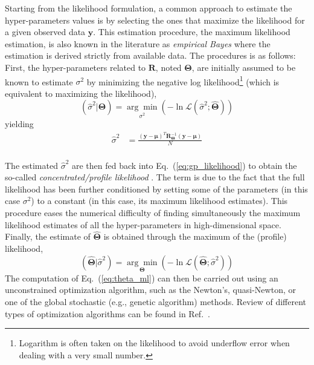 Starting from the likelihood formulation, a common approach to estimate the hyper-parameters values is by selecting the ones that maximize the likelihood for a given observed data $\mathbf{y}$.
This estimation procedure, the maximum likelihood estimation, is also known in the literature as \emph{empirical Bayes} \cite{Koehler1996} where the estimation is derived strictly from available data.
The procedures is as follows:
First, the hyper-parameters related to $\mathbf{R}$, noted $\boldsymbol{\Theta}$, are initially assumed to be known to estimate $\sigma^2$ by minimizing the negative log likelihood\footnote{Logarithm is often taken on the likelihood to avoid underflow error when dealing with a very small number.} (which is equivalent to maximizing the likelihood),
\begin{equation}
	\left(\hat{\sigma}^2 | \boldsymbol{\Theta}\right) = \underset{\sigma^2}{\arg\min} \left(- \ln \mathcal{L} (\hat{\sigma}^2 ; \hat{\boldsymbol{\Theta}})\right)
\label{eq:concentrated_likelihood_1}
\end{equation} 
yielding
\begin{equation}
	\begin{split}
		\hat{\sigma}^2           & = \frac{(\mathbf{y} - \boldsymbol{\mu})^T \mathbf{R}_{\boldsymbol{\Theta}}^{-1} (\mathbf{y} - \boldsymbol{\mu})}{N}\\
	\end{split}
\label{eq:sigma_ml}
\end{equation}

The estimated $\hat{\sigma}^2$ are then fed back into Eq.~(\ref{eq:gp_likelihood}) to obtain the so-called \emph{concentrated/profile likelihood} \cite{Cole2013,Kreutz2013}.
The term is due to the fact that the full likelihood has been further conditioned by setting some of the parameters 
(in this case $\sigma^2$) to a constant (in this case, its maximum likelihood estimates).
This procedure eases the numerical difficulty of finding simultaneously the maximum likelihood estimates of all the hyper-parameters in high-dimensional space.
Finally, the estimate of $\hat{\boldsymbol{\Theta}}$ is obtained through the maximum of the (profile) likelihood,
\begin{equation}
	\left(\hat{\boldsymbol{\Theta}} | \hat{\sigma}^2\right) = \underset{\boldsymbol{\Theta}}{\arg\min} \left(- \ln \mathcal{L} (\hat{\boldsymbol{\Theta}};\hat{\sigma}^2)\right)
	\label{eq:theta_ml}
\end{equation}
The computation of Eq.~(\ref{eq:theta_ml}) can then be carried out using an unconstrained optimization algorithm, 
such as the Newton's, quasi-Newton, or one of the global stochastic (e.g., genetic algorithm) methods.
Review of different types of optimization algorithms can be found in Ref.~\cite{Venter2010}.

